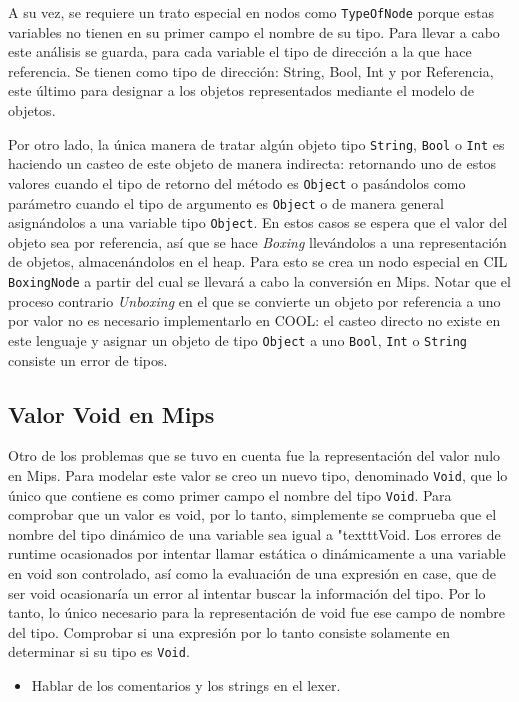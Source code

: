 \documentclass[11pt]{scrartcl} %
\begin{document}
A su vez, se requiere un trato especial en nodos como \texttt{TypeOfNode} porque estas variables no tienen en su primer campo el nombre de su tipo. Para llevar a cabo este análisis se guarda, para cada variable el tipo de dirección a la que hace referencia. Se tienen como tipo de dirección: String, Bool, Int y por Referencia, este último para designar a los objetos representados mediante el modelo de objetos.

Por otro lado, la única manera de tratar algún objeto tipo \texttt{String}, \texttt{Bool} o \texttt{Int} es haciendo un casteo de este objeto de manera indirecta: retornando uno de estos valores cuando el tipo de retorno del método es \texttt{Object} o pasándolos como parámetro cuando el tipo de argumento es \texttt{Object} o de manera general asignándolos a una variable tipo \texttt{Object}. En estos casos se espera que el valor del objeto sea por referencia, así que se hace \textit{Boxing} llevándolos a una representación de objetos, almacenándolos en el heap. Para esto se crea un nodo especial en CIL \texttt{BoxingNode} a partir del cual se llevará a cabo la conversión en Mips. Notar que el proceso contrario \textit{Unboxing} en el que se convierte un objeto por referencia a uno por valor no es necesario implementarlo en COOL: el casteo directo no existe en este lenguaje y asignar un objeto de tipo \texttt{Object} a uno \texttt{Bool}, \texttt{Int} o \texttt{String} consiste un error de tipos.

\subsection{Valor Void en Mips}

Otro de los problemas que se tuvo en cuenta fue la representación del valor nulo en Mips. Para modelar este valor se creo un nuevo tipo, denominado \texttt{Void}, que lo único que contiene es como primer campo el nombre del tipo \texttt{Void}. Para comprobar que un valor es void, por lo tanto, simplemente se comprueba que el nombre del tipo dinámico de una variable sea igual a "texttt{Void}. Los errores de runtime ocasionados por intentar llamar estática o dinámicamente a una variable en void son controlado, así como la evaluación de una expresión en case, que de ser void ocasionaría un error al intentar buscar la información del tipo. Por lo tanto, lo único necesario para la representación de void fue ese campo de nombre del tipo. Comprobar si una expresión por lo tanto consiste solamente en determinar si su tipo es \texttt{Void}.


\begin{itemize}
	\item Hablar de los comentarios y los strings en el lexer.
\end{itemize}

\end{document}
